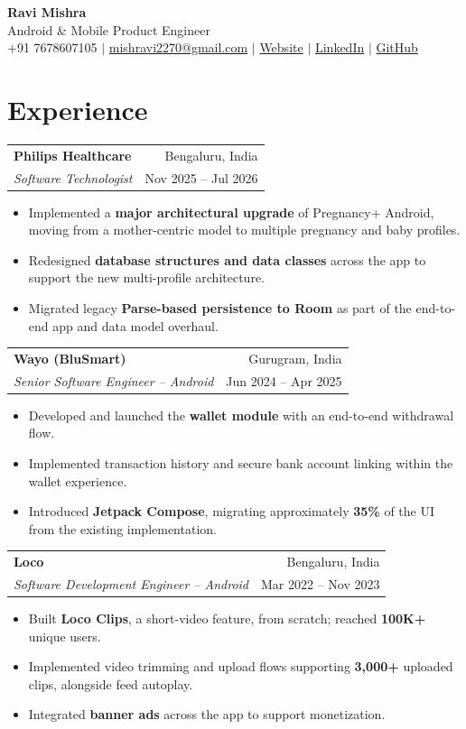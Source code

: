 \documentclass[letterpaper,12pt]{article}
\makeatletter
\renewcommand{\small}{\fontsize{11}{13}\selectfont}
\renewcommand{\Huge}{\fontsize{25.88}{31}\selectfont}
\newcommand{\metric}[1]{\textbf{#1}}
\newcommand{\employment}[4]{%
  \begin{tabularx}{\textwidth}{@{}X r@{}}
    \textbf{#3} & {\small #4} \\
    {\small\textit{#1}} & {\small #2}
  \end{tabularx}%
}
\makeatother
\begin{document}
\begin{center}
  {\Huge\bfseries Ravi Mishra}\\[4pt]
  {\small Android \& Mobile Product Engineer}\\[3pt]
  \small +91 7678607105 $|$
  \href{mailto:mishravi2270@gmail.com}{mishravi2270@gmail.com} $|$
  \href{https://ravimishra2270.github.io/}{Website} $|$
  \href{https://www.linkedin.com/in/ravi-mishra-android-dev/}{LinkedIn} $|$
  \href{https://github.com/ravimishra07}{GitHub}
\end{center}
\vspace{-8pt}

\section{Experience}
\employment{Software Technologist}{Nov 2025 -- Jul 2026}
  {Philips Healthcare}{Bengaluru, India}
\begin{itemize}
  \item Implemented a \textbf{major architectural upgrade} of Pregnancy+ Android, moving from a mother-centric model to multiple pregnancy and baby profiles.
  \item Redesigned \textbf{database structures and data classes} across the app to support the new multi-profile architecture.
  \item Migrated legacy \textbf{Parse-based persistence to Room} as part of the end-to-end app and data model overhaul.
\end{itemize}\vspace{2pt}

\employment{Senior Software Engineer -- Android}{Jun 2024 -- Apr 2025}
  {Wayo (BluSmart)}{Gurugram, India}
\begin{itemize}
  \item Developed and launched the \textbf{wallet module} with an end-to-end withdrawal flow.
  \item Implemented transaction history and secure bank account linking within the wallet experience.
  \item Introduced \textbf{Jetpack Compose}, migrating approximately \metric{35\%} of the UI from the existing implementation.
\end{itemize}\vspace{2pt}

\employment{Software Development Engineer -- Android}{Mar 2022 -- Nov 2023}
  {Loco}{Bengaluru, India}
\begin{itemize}
  \item Built \textbf{Loco Clips}, a short-video feature, from scratch; reached \metric{100K+} unique users.
  \item Implemented video trimming and upload flows supporting \metric{3,000+} uploaded clips, alongside feed autoplay.
  \item Integrated \textbf{banner ads} across the app to support monetization.
\end{itemize}\vspace{2pt}
\end{document}
